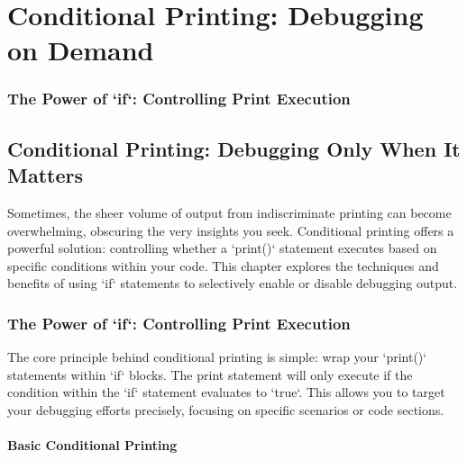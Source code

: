 \documentclass{article}
\begin{document}
{{{%

\part*{Conditional Printing: Debugging on Demand} %
\label{part-5-Conditional_Printing__Debugging_on_Deman}


\section*{The Power of `if`: Controlling Print Execution} %
\label{chapter-5-1-The_Power_of__if___Controlling_Print_Exe}

\chapter{Conditional Printing: Debugging Only When It Matters}

Sometimes, the sheer volume of output from indiscriminate printing can become overwhelming, obscuring the very insights you seek. Conditional printing offers a powerful solution: controlling whether a `print()` statement executes based on specific conditions within your code. This chapter explores the techniques and benefits of using `if` statements to selectively enable or disable debugging output.

\section{The Power of `if`: Controlling Print Execution}

The core principle behind conditional printing is simple: wrap your `print()` statements within `if` blocks. The print statement will only execute if the condition within the `if` statement evaluates to `true`. This allows you to target your debugging efforts precisely, focusing on specific scenarios or code sections.

\subsection*{Basic Conditional Printing}

}}}
\end{document}
